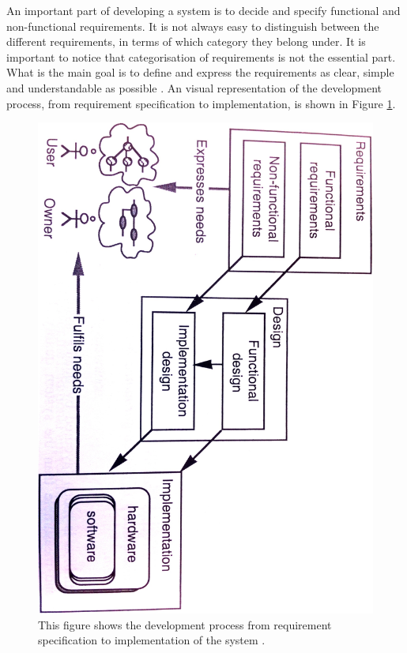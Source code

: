 An important part of developing a system is to decide and specify functional and non-functional requirements. It is not always easy to distinguish between the different requirements, in terms of which category they belong under. It is important to notice that categorisation of requirements is not the essential part. What is the main goal is to define and express the requirements as clear, simple and understandable as possible \cite{systemutviklingDel1}. An visual representation of the development process, from requirement specification to implementation, is shown in Figure \ref{fig:requirements}.  

\begin{figure} [H]
\centering
\includegraphics[scale=0.1]{requirements.jpg}
\caption[Main descriptions of system design]{This figure shows the development process from requirement specification to implementation of the system \cite{systemutviklingDel1}.}
\label{fig:requirements}
\end{figure} 

